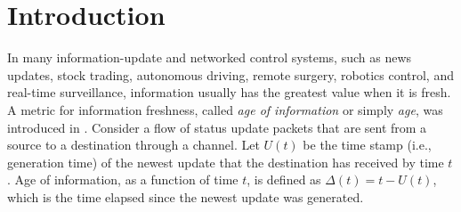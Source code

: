 \section{Introduction}

%

In many information-update and networked control systems, such as news updates, stock trading, autonomous driving, remote surgery, robotics control, and real-time surveillance, information usually has the greatest value when it is fresh. A metric for information freshness, called  \emph{age of information} or simply  \emph{age}, was introduced in \cite{Song1990,KaulYatesGruteser-Infocom2012}. Consider a flow of status update packets that are sent from a source to a destination through a channel. 
Let $U(t)$ be the time stamp (i.e., generation time) of the {newest update that the destination has received} by time $t$. {Age of information, as a function of time $t$, is defined as} 
$\Delta (t) = t - U(t)$, which is the time elapsed since the newest update was generated.


